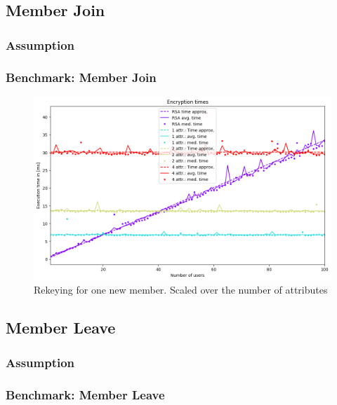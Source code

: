 \subsection{Member Join}
\subsubsection{Assumption}
\subsubsection{Benchmark: Member Join}

\begin{figure}[!ht]
\centering
    \includegraphics[width=\linewidth]{img/eval-join/join_attr_1.png}
    \caption{Rekeying for one new member. Scaled over the number of attributes}
    \label{fig:member-join}
\end{figure}

\subsection{Member Leave}
\subsubsection{Assumption}
\subsubsection{Benchmark: Member Leave}

